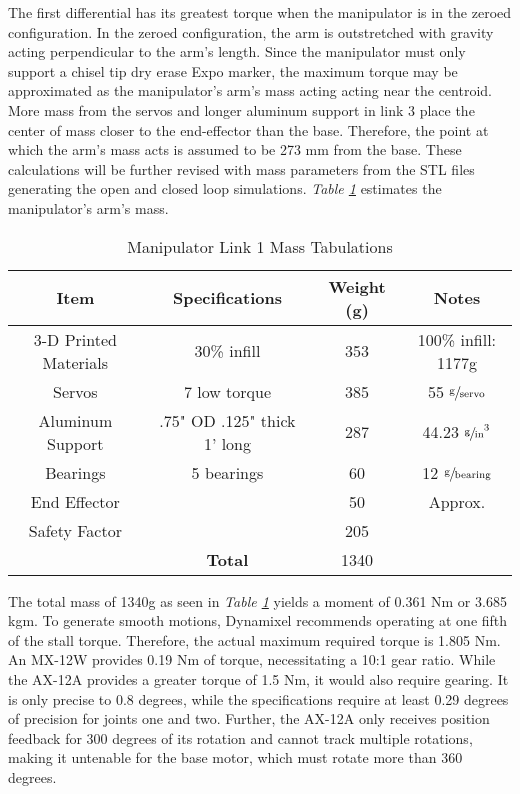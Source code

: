 The first differential has its greatest torque when the manipulator is in the zeroed configuration. In the zeroed configuration, the arm is outstretched with gravity acting perpendicular to the arm’s length. Since the manipulator must only support a chisel tip dry erase Expo marker, the maximum torque may be approximated as the manipulator’s arm’s mass acting acting near the centroid. More mass from the servos and longer aluminum support in link 3 place the center of mass closer to the end-effector than the base. Therefore, the point at which the arm’s mass acts is assumed to be 273 mm from the base. These calculations will be further revised with mass parameters from the STL files generating the open and closed loop simulations. \emph{Table \ref{tab:arm1}} estimates the manipulator’s arm’s mass.

\begin{table}[htp]
  \center
  \caption{Manipulator Link 1 Mass Tabulations}
  \label{tab:arm1}
\begin{tabular}{cc|cc}
  \textbf{Item} & \textbf{Specifications} & \textbf{Weight (g)} & \textbf{Notes} \\\hline
  3-D Printed Materials & 30\% infill & 353 & 100\% infill: 1177g \\
  Servos & 7 low torque & 385 & 55 $\sfrac{\text{g}}{\text{servo}}$ \\
  Aluminum Support & .75" OD .125" thick 1' long & 287 & 44.23 $\sfrac{\text{g}}{\text{in}}^3$ \\
  Bearings & 5 bearings & 60 & 12 $\sfrac{\text{g}}{\text{bearing}}$ \\
  End Effector & & 50 & Approx. \\
  Safety Factor & & 205 & \\
  & \textbf{Total} & 1340 & \\
\end{tabular}
\end{table}

The total mass of 1340g as seen in \emph{Table \ref{tab:arm1}} yields a moment of 0.361 Nm or 3.685 kgm. To generate smooth motions, Dynamixel recommends operating at one fifth of the stall torque. Therefore, the actual maximum required torque is 1.805 Nm. An MX-12W provides 0.19 Nm of torque, necessitating a 10:1 gear ratio. While the AX-12A provides a greater torque of 1.5 Nm, it would also require gearing. It is only precise to 0.8 degrees, while the specifications require at least 0.29 degrees of precision for joints one and two. Further, the AX-12A only receives position feedback for 300 degrees of its rotation and cannot track multiple rotations, making it untenable for the base motor, which must rotate more than 360 degrees.

